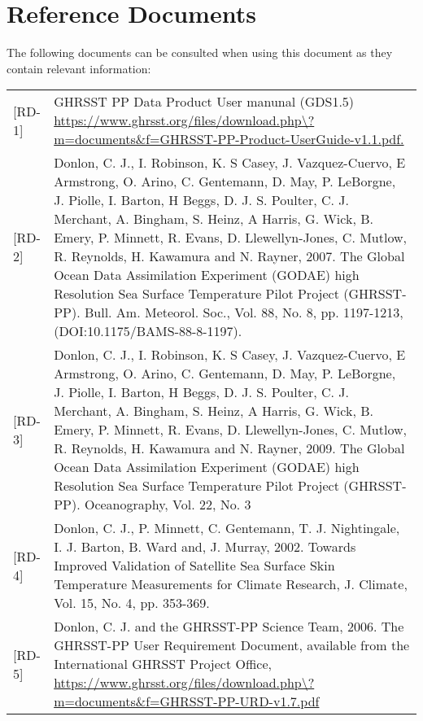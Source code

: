 \section{Reference Documents}
\par\vspace{0.5cm}
The following documents can be consulted when using this document as they contain relevant information:
\par\vspace{0.5cm}
\begin{tabular}{ l p{13cm} }
[RD-1] & GHRSST PP Data Product User manunal (GDS1.5) \url{https://www.ghrsst.org/files/download.php\?m=documents\&f=GHRSST-PP-Product-UserGuide-v1.1.pdf.} \\

[RD-2] & Donlon, C. J., I. Robinson, K. S Casey, J. Vazquez-Cuervo, E Armstrong, O. Arino, C.
Gentemann, D. May, P. LeBorgne, J. Piolle, I. Barton, H Beggs, D. J. S. Poulter, C. J.
Merchant, A. Bingham, S. Heinz, A Harris, G. Wick, B. Emery, P. Minnett, R. Evans, D.
Llewellyn-Jones, C. Mutlow, R. Reynolds, H. Kawamura and N. Rayner, 2007. The Global
Ocean Data Assimilation Experiment (GODAE) high Resolution Sea Surface Temperature
Pilot Project (GHRSST-PP). Bull. Am. Meteorol. Soc., Vol. 88, No. 8, pp. 1197-1213,
(DOI:10.1175/BAMS-88-8-1197). \\

[RD-3] & Donlon, C. J., I. Robinson, K. S Casey, J. Vazquez-Cuervo, E Armstrong, O. Arino, C.
Gentemann, D. May, P. LeBorgne, J. Piolle, I. Barton, H Beggs, D. J. S. Poulter, C. J.
Merchant, A. Bingham, S. Heinz, A Harris, G. Wick, B. Emery, P. Minnett, R. Evans, D.
Llewellyn-Jones, C. Mutlow, R. Reynolds, H. Kawamura and N. Rayner, 2009. The Global
Ocean Data Assimilation Experiment (GODAE) high Resolution Sea Surface Temperature
Pilot Project (GHRSST-PP). Oceanography, Vol. 22, No. 3 \\

[RD-4] & Donlon, C. J., P. Minnett, C. Gentemann, T. J. Nightingale, I. J. Barton, B. Ward and, J.
Murray, 2002. Towards Improved Validation of Satellite Sea Surface Skin Temperature
Measurements for Climate Research, J. Climate, Vol. 15, No. 4, pp. 353-369. \\

[RD-5] & Donlon, C. J. and the GHRSST-PP Science Team, 2006. The GHRSST-PP User Requirement Document, available from the International GHRSST Project Office, \url{https://www.ghrsst.org/files/download.php\?m=documents\&f=GHRSST-PP-URD-v1.7.pdf} \\
\end{tabular}
